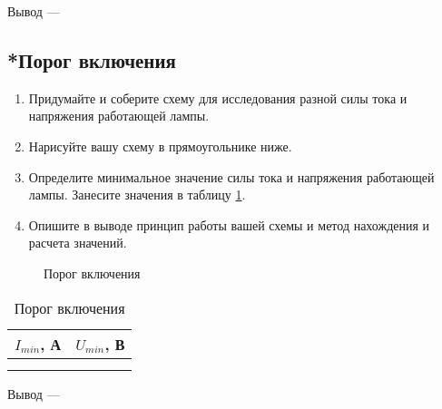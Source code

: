 Вывод --- \hrulefill 

\hrulefill 

\hrulefill 

\subsection{*Порог включения}

\begin{enumerate}
\item Придумайте и соберите схему для исследования разной силы тока и напряжения работающей лампы.
\item Нарисуйте вашу схему в прямоугольнике ниже. 
\item Определите минимальное значение силы тока и напряжения работающей лампы. Занесите значения в таблицу \ref{tab:1.5}.
\item Опишите в выводе принцип работы вашей схемы и метод нахождения и расчета значений.
\end{enumerate}


\begin{figure}[h]
\centering
{}
\caption{Порог включения}
\label{fig:2.5}
\end{figure}

\begin{table}[h]
\centering
\caption{Порог включения}
\label{tab:1.5}
\begin{tabular}{|c|c|}
\hline
$I_{min}$, А & $U_{min}$, В \\
\hline
& \\
& \\
\hline
\end{tabular}

\end{table}

Вывод --- \hrulefill

\hrulefill

\hrulefill

\hrulefill

\newpage